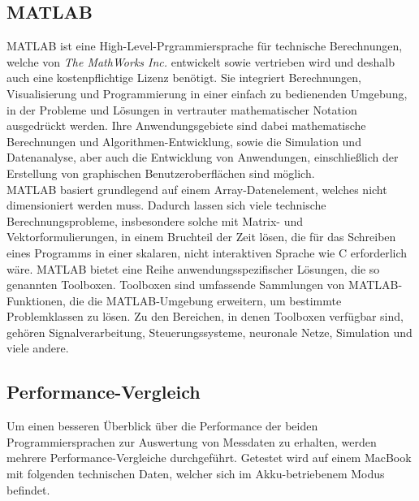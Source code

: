 
\subsection{MATLAB}

MATLAB ist eine High-Level-Prgrammiersprache für technische Berechnungen, welche von \textit{The MathWorks Inc.} entwickelt sowie vertrieben wird und deshalb auch eine kostenpflichtige Lizenz benötigt. Sie integriert Berechnungen, Visualisierung und Programmierung in einer einfach zu bedienenden Umgebung, in der Probleme und Lösungen in vertrauter mathematischer Notation ausgedrückt werden. Ihre Anwendungsgebiete sind dabei mathematische Berechnungen und Algorithmen-Entwicklung, sowie die Simulation und Datenanalyse, aber auch die Entwicklung von Anwendungen, einschließlich der Erstellung von graphischen Benutzeroberflächen sind möglich.\\
MATLAB basiert grundlegend auf einem Array-Datenelement, welches nicht dimensioniert werden muss. Dadurch lassen sich viele technische Berechnungsprobleme, insbesondere solche mit Matrix- und Vektorformulierungen, in einem Bruchteil der Zeit lösen, die für das Schreiben eines Programms in einer skalaren, nicht interaktiven Sprache wie C erforderlich wäre. MATLAB bietet eine Reihe anwendungsspezifischer Lösungen, die so genannten Toolboxen. Toolboxen sind umfassende Sammlungen von MATLAB-Funktionen, die die MATLAB-Umgebung erweitern, um bestimmte Problemklassen zu lösen. Zu den Bereichen, in denen Toolboxen verfügbar sind, gehören Signalverarbeitung, Steuerungssysteme, neuronale Netze, Simulation und viele andere.


\subsection{Performance-Vergleich}

Um einen besseren Überblick über die Performance der beiden Programmiersprachen zur Auswertung von Messdaten zu erhalten, werden mehrere Performance-Vergleiche durchgeführt. Getestet wird auf einem MacBook mit folgenden technischen Daten, welcher sich im Akku-betriebenem Modus befindet. 


